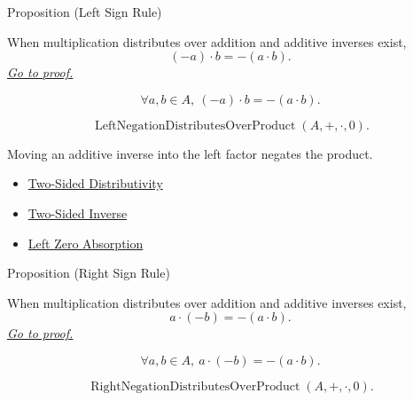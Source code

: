 \begin{propositionbox}{Proposition (Left Sign Rule)}
\begin{proposition}
\label{prop:left-sign-rule}
When multiplication distributes over addition and additive inverses exist,
\[
(-a)\cdot b=-(a\cdot b).
\]
\hyperref[prf:left-sign-rule]{\textit{Go to proof.}}
\end{proposition}
\end{propositionbox}

\begin{remark*}
\[
\forall a,b\in A,\ (-a)\cdot b=-(a\cdot b).
\]
\end{remark*}

\begin{remark*}
\[
\operatorname{LeftNegationDistributesOverProduct}(A,+,\cdot,0).
\]
\end{remark*}

\begin{remark*}[Interpretation]
Moving an additive inverse into the left factor negates the product.
\end{remark*}

\begin{dependencies}
\begin{itemize}
  \item \hyperref[def:two-sided-distributivity]{Two-Sided Distributivity}
  \item \hyperref[def:two-sided-inverse]{Two-Sided Inverse}
  \item \hyperref[prop:left-zero-absorption]{Left Zero Absorption}
\end{itemize}
\end{dependencies}

\begin{propositionbox}{Proposition (Right Sign Rule)}
\begin{proposition}
\label{prop:right-sign-rule}
When multiplication distributes over addition and additive inverses exist,
\[
a\cdot(-b)=-(a\cdot b).
\]
\hyperref[prf:right-sign-rule]{\textit{Go to proof.}}
\end{proposition}
\end{propositionbox}

\begin{remark*}
\[
\forall a,b\in A,\ a\cdot(-b)=-(a\cdot b).
\]
\end{remark*}

\begin{remark*}
\[
\operatorname{RightNegationDistributesOverProduct}(A,+,\cdot,0).
\]
\end{remark*}

